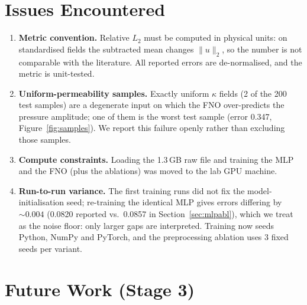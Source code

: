 \documentclass[11pt,a4paper]{article}
\begin{document}
\section{Issues Encountered}
\label{sec:issues}

\begin{enumerate}[nosep]
  \item \textbf{Metric convention.} Relative $L_2$ must be computed in physical units: on standardised fields the subtracted mean changes $\|u\|_2$, so the number is not comparable with the literature. All reported errors are de-normalised, and the metric is unit-tested.
  \item \textbf{Uniform-permeability samples.} Exactly uniform $\kappa$ fields (2 of the 200 test samples) are a degenerate input on which the FNO over-predicts the pressure amplitude; one of them is the worst test sample (error 0.347, Figure~\ref{fig:samples}). We report this failure openly rather than excluding those samples.
  \item \textbf{Compute constraints.} Loading the 1.3\,GB raw file and training the MLP and the FNO (plus the ablations) was moved to the lab GPU machine.
  \item \textbf{Run-to-run variance.} The first training runs did not fix the model-initialisation seed; re-training the identical MLP gives errors differing by $\sim0.004$ (0.0820 reported vs.\ 0.0857 in Section~\ref{sec:mlpabl}), which we treat as the noise floor: only larger gaps are interpreted. Training now seeds Python, NumPy and PyTorch, and the preprocessing ablation uses 3 fixed seeds per variant.
\end{enumerate}

\section{Future Work (Stage 3)}
\label{sec:future}
\end{document}
